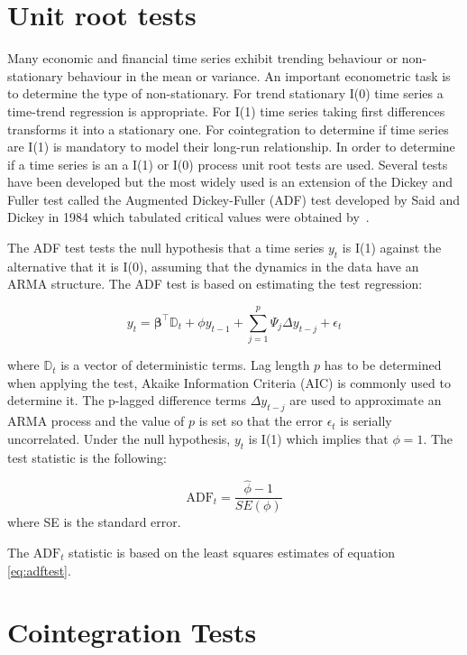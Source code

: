 \section{Unit root tests}
Many economic and financial time series exhibit trending behaviour or non-stationary behaviour in the mean or variance. An important econometric task is to determine the type of non-stationary. For trend stationary I(0) time series a time-trend regression is appropriate. For I(1) time series taking first differences transforms it into a stationary one.  For cointegration to determine if time series are I(1) is mandatory to model their long-run relationship. In order to determine if a time series is an a I(1) or I(0) process unit root tests are used. Several tests have been developed but the most widely used is an extension of the Dickey and Fuller test \cite{dickey1979} called the Augmented Dickey-Fuller (ADF) test developed by Said and Dickey in 1984\cite{said1984} which tabulated critical values were obtained by~\cite{mackinnon2010}. 

The ADF test tests the null hypothesis that a time series $y_t$ is I(1) against the alternative that it is I(0), assuming that the dynamics in the data have an ARMA structure. The ADF test is based on estimating the test regression:

\begin{equation}
\label{eq:adftest}
y_t = \boldsymbol{\beta}^\top \mathbb{D}_t + \phi y_{t-1} + \sum_{j=1}^p \Psi_j \Delta y_{t-j} + \epsilon_t
\end{equation}

\noindent where $\mathbb{D}_t$ is a vector of deterministic terms. Lag length $p$ has to be determined when applying the test, Akaike Information Criteria (AIC) is commonly used to determine it.
The p-lagged difference terms $\Delta y_{t-j}$ are used to approximate an ARMA process and the value of $p$ is set so that the error $\epsilon_t$ is serially uncorrelated. 
Under the null hypothesis, $y_t$ is I(1) which implies that $\phi=1$. 
The test statistic is the following:

\[
\text{ADF}_t = \frac{\hat{\phi} -1}{SE(\phi)}
\]
\noindent where SE is the standard error.

The $\text{ADF}_t$ statistic is based on the least squares estimates of equation \ref{eq:adftest}.

\section {Cointegration Tests}

